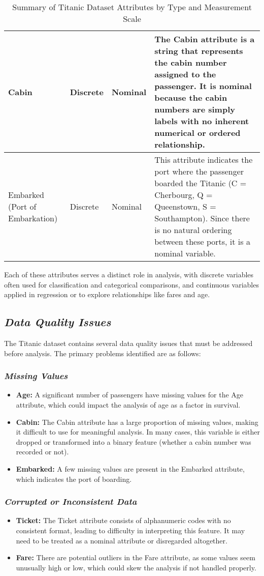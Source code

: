 \documentclass[twoside,11pt]{article}
\makeatletter
\let\@oldsubsection\subsection
\renewcommand\subsection[1]{\@oldsubsection*{\textit{#1}}}
\let\@oldsubsubsection\subsubsection
\renewcommand\subsubsection[1]{\@oldsubsubsection*{\textit{#1}}}
\makeatother
\begin{document}
\begin{table}[h!]
\begin{tabular}{|l|l|l|p{8cm}|}
Cabin & Discrete & Nominal & The Cabin attribute is a string that represents the cabin number assigned to the passenger. It is nominal because the cabin numbers are simply labels with no inherent numerical or ordered relationship. \\ \hline
Embarked (Port of Embarkation) & Discrete & Nominal & This attribute indicates the port where the passenger boarded the Titanic (C = Cherbourg, Q = Queenstown, S = Southampton). Since there is no natural ordering between these ports, it is a nominal variable. \\ \hline
\end{tabular}
\caption{Summary of Titanic Dataset Attributes by Type and Measurement Scale}
\end{table}

Each of these attributes serves a distinct role in analysis, with discrete variables often used for classification and categorical comparisons, and continuous variables applied in regression or to explore relationships like fares and age.

\subsection{Data Quality Issues}
The Titanic dataset contains several data quality issues that must be addressed before analysis. The primary problems identified are as follows:

\subsubsection{Missing Values}
\begin{itemize}
    \item \textbf{Age:} A significant number of passengers have missing values for the Age attribute, which could impact the analysis of age as a factor in survival.
    \item \textbf{Cabin:} The Cabin attribute has a large proportion of missing values, making it difficult to use for meaningful analysis. In many cases, this variable is either dropped or transformed into a binary feature (whether a cabin number was recorded or not).
    \item \textbf{Embarked:} A few missing values are present in the Embarked attribute, which indicates the port of boarding.
\end{itemize}

\subsubsection{Corrupted or Inconsistent Data}
\begin{itemize}
    \item \textbf{Ticket:} The Ticket attribute consists of alphanumeric codes with no consistent format, leading to difficulty in interpreting this feature. It may need to be treated as a nominal attribute or disregarded altogether.
    \item \textbf{Fare:} There are potential outliers in the Fare attribute, as some values seem unusually high or low, which could skew the analysis if not handled properly.
\end{itemize}
\end{document}
